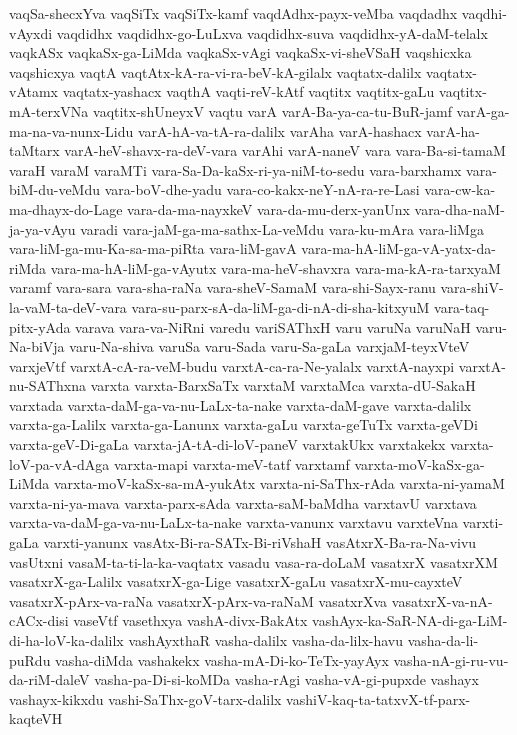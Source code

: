 {vaqSa-shecxYva
vaqSiTx
vaqSiTx-kamf
vaqdAdhx-payx-veMba
vaqdadhx
vaqdhi-vAyxdi
vaqdidhx
vaqdidhx-go-LuLxva
vaqdidhx-suva
vaqdidhx-yA-daM-telalx
vaqkASx
vaqkaSx-ga-LiMda
vaqkaSx-vAgi
vaqkaSx-vi-sheVSaH
vaqshicxka
vaqshicxya
vaqtA
vaqtAtx-kA-ra-vi-ra-beV-kA-gilalx
vaqtatx-dalilx
vaqtatx-vAtamx
vaqtatx-yashacx
vaqthA
vaqti-reV-kAtf
vaqtitx
vaqtitx-gaLu
vaqtitx-mA-terxVNa
vaqtitx-shUneyxV
vaqtu
varA
varA-Ba-ya-ca-tu-BuR-jamf
varA-ga-ma-na-va-nunx-Lidu
varA-hA-va-tA-ra-dalilx
varAha
varA-hashacx
varA-ha-taMtarx
varA-heV-shavx-ra-deV-vara
varAhi
varA-naneV
vara
vara-Ba-si-tamaM
varaH
varaM
varaMTi
vara-Sa-Da-kaSx-ri-ya-niM-to-sedu
vara-barxhamx
vara-biM-du-veMdu
vara-boV-dhe-yadu
vara-co-kakx-neY-nA-ra-re-Lasi
vara-cw-ka-ma-dhayx-do-Lage
vara-da-ma-nayxkeV
vara-da-mu-derx-yanUnx
vara-dha-naM-ja-ya-vAyu
varadi
vara-jaM-ga-ma-sathx-La-veMdu
vara-ku-mAra
vara-liMga
vara-liM-ga-mu-Ka-sa-ma-piRta
vara-liM-gavA
vara-ma-hA-liM-ga-vA-yatx-da-riMda
vara-ma-hA-liM-ga-vAyutx
vara-ma-heV-shavxra
vara-ma-kA-ra-tarxyaM
varamf
vara-sara
vara-sha-raNa
vara-sheV-SamaM
vara-shi-Sayx-ranu
vara-shiV-la-vaM-ta-deV-vara
vara-su-parx-sA-da-liM-ga-di-nA-di-sha-kitxyuM
vara-taq-pitx-yAda
varava
vara-va-NiRni
varedu
variSAThxH
varu
varuNa
varuNaH
varu-Na-biVja
varu-Na-shiva
varuSa
varu-Sada
varu-Sa-gaLa
varxjaM-teyxVteV
varxjeVtf
varxtA-cA-ra-veM-budu
varxtA-ca-ra-Ne-yalalx
varxtA-nayxpi
varxtA-nu-SAThxna
varxta
varxta-BarxSaTx
varxtaM
varxtaMca
varxta-dU-SakaH
varxtada
varxta-daM-ga-va-nu-LaLx-ta-nake
varxta-daM-gave
varxta-dalilx
varxta-ga-Lalilx
varxta-ga-Lanunx
varxta-gaLu
varxta-geTuTx
varxta-geVDi
varxta-geV-Di-gaLa
varxta-jA-tA-di-loV-paneV
varxtakUkx
varxtakekx
varxta-loV-pa-vA-dAga
varxta-mapi
varxta-meV-tatf
varxtamf
varxta-moV-kaSx-ga-LiMda
varxta-moV-kaSx-sa-mA-yukAtx
varxta-ni-SaThx-rAda
varxta-ni-yamaM
varxta-ni-ya-mava
varxta-parx-sAda
varxta-saM-baMdha
varxtavU
varxtava
varxta-va-daM-ga-va-nu-LaLx-ta-nake
varxta-vanunx
varxtavu
varxteVna
varxti-gaLa
varxti-yanunx
vasAtx-Bi-ra-SATx-Bi-riVshaH
vasAtxrX-Ba-ra-Na-vivu
vasUtxni
vasaM-ta-ti-la-ka-vaqtatx
vasadu
vasa-ra-doLaM
vasatxrX
vasatxrXM
vasatxrX-ga-Lalilx
vasatxrX-ga-Lige
vasatxrX-gaLu
vasatxrX-mu-cayxteV
vasatxrX-pArx-va-raNa
vasatxrX-pArx-va-raNaM
vasatxrXva
vasatxrX-va-nA-cACx-disi
vaseVtf
vasethxya
vashA-divx-BakAtx
vashAyx-ka-SaR-NA-di-ga-LiM-di-ha-loV-ka-dalilx
vashAyxthaR
vasha-dalilx
vasha-da-lilx-havu
vasha-da-li-puRdu
vasha-diMda
vashakekx
vasha-mA-Di-ko-TeTx-yayAyx
vasha-nA-gi-ru-vu-da-riM-daleV
vasha-pa-Di-si-koMDa
vasha-rAgi
vasha-vA-gi-pupxde
vashayx
vashayx-kikxdu
vashi-SaThx-goV-tarx-dalilx
vashiV-kaq-ta-tatxvX-tf-parx-kaqteVH
}

